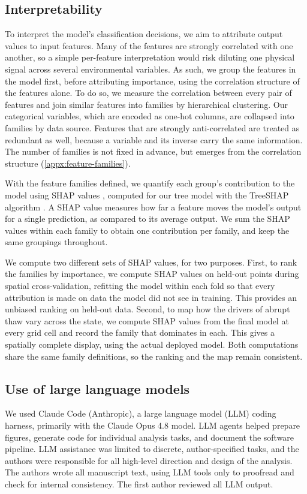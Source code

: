 \documentclass[../main.tex]{subfiles}
\begin{document}
\subsection{Interpretability}

To interpret the model's classification decisions, we aim to attribute output values to input features. Many of the features are strongly correlated with one another, so a simple per-feature interpretation would risk diluting one physical signal across several environmental variables. As such, we group the features in the model first, before attributing importance, using the correlation structure of the features alone. To do so, we measure the correlation between every pair of features and join similar features into families by hierarchical clustering. Our categorical variables, which are encoded as one-hot columns, are collapsed into families by data source. Features that are strongly anti-correlated are treated as redundant as well, because a variable and its inverse carry the same information. The number of families is not fixed in advance, but emerges from the correlation structure (\ref{appx:feature-families}).

With the feature families defined, we quantify each group's contribution to the model using SHAP values \citep{lundberg2017unified}, computed for our tree model with the TreeSHAP algorithm \citep{lundberg2020local}. A SHAP value measures how far a feature moves the model's output for a single prediction, as compared to its average output. We sum the SHAP values within each family to obtain one contribution per family, and keep the same groupings throughout.

We compute two different sets of SHAP values, for two purposes. First, to rank the families by importance, we compute SHAP values on held-out points during spatial cross-validation, refitting the model within each fold so that every attribution is made on data the model did not see in training. This provides an unbiased ranking on held-out data. Second, to map how the drivers of abrupt thaw vary across the state, we compute SHAP values from the final model at every grid cell and record the family that dominates in each. This gives a spatially complete display, using the actual deployed model. Both computations share the same family definitions, so the ranking and the map remain consistent.

\subsection{Use of large language models}
We used Claude Code (Anthropic), a large language model (LLM) coding harness, primarily with the Claude Opus 4.8 model. LLM agents helped prepare figures, generate code for individual analysis tasks, and document the software pipeline. LLM assistance was limited to discrete, author-specified tasks, and the authors were responsible for all high-level direction and design of the analysis. The authors wrote all manuscript text, using LLM tools only to proofread and check for internal consistency. The first author reviewed all LLM output.
\end{document}
